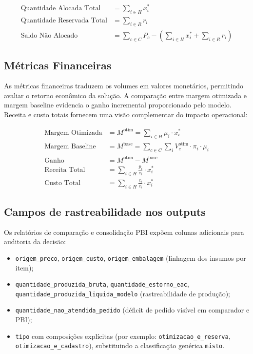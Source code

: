 \documentclass[11pt,a4paper]{article}
\begin{document}
\begin{align}\label{eq:auto:al:010}
\text{Quantidade Alocada Total} &= \sum_{i \in H} x_i^* \\[6pt]
\text{Quantidade Reservada Total} &= \sum_{i \in R} r_i \\[6pt]
\text{Saldo Não Alocado} &= \sum_{c \in C} P_c - \left(\sum_{i \in H} x_i^* + \sum_{i \in R} r_i\right)
\end{align}

\subsection{Métricas Financeiras}

As métricas financeiras traduzem os volumes em valores monetários, permitindo
avaliar o retorno econômico da solução. A comparação entre margem otimizada e
margem baseline evidencia o ganho incremental proporcionado pelo modelo. Receita
e custo totais fornecem uma visão complementar do impacto operacional:

\begin{align}\label{eq:auto:al:011}
\text{Margem Otimizada} &= M^{\text{otim}} = \sum_{i \in H} \mu_i \cdot x_i^* \\[6pt]
\text{Margem Baseline} &= M^{\text{base}} = \sum_{c \in C} \sum_{i} V_c^{\text{otim}} \cdot \pi_i \cdot \mu_i \\[6pt]
\text{Ganho} &= M^{\text{otim}} - M^{\text{base}} \\[6pt]
\text{Receita Total} &= \sum_{i \in H} \frac{p_i}{e_i} \cdot x_i^* \\[6pt]
\text{Custo Total} &= \sum_{i \in H} \frac{c_i}{e_i} \cdot x_i^*
\end{align}

\subsection{Campos de rastreabilidade nos outputs}

Os relatórios de comparação e consolidação PBI expõem colunas adicionais para
auditoria da decisão:
\begin{itemize}
    \item \texttt{origem\_preco}, \texttt{origem\_custo}, \texttt{origem\_embalagem}
        (linhagem dos insumos por item);
    \item \texttt{quantidade\_produzida\_bruta},
        \texttt{quantidade\_estorno\_eac},
        \texttt{quantidade\_produzida\_liquida\_modelo}
        (rastreabilidade de produção);
    \item \texttt{quantidade\_nao\_atendida\_pedido}
        (déficit de pedido visível em comparador e PBI);
    \item \texttt{tipo} com composições explícitas (por exemplo:
        \texttt{otimizacao\_e\_reserva}, \texttt{otimizacao\_e\_cadastro}),
        substituindo a classificação genérica \texttt{misto}.
\end{itemize}
\end{document}
